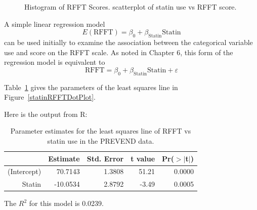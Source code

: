 \begin{figure}[ht]
	\centering
	\caption{ Histogram of RFFT Scores.  scatterplot of statin use vs RFFT score.}
	\label{statinRFFTPlots}
\end{figure}


A simple linear regression model
\[
   E(\text{RFFT}) = \beta_0 + \beta_{\text{Statin}}\text{Statin}
   \label{RFFTStatinModel}
\]
can be used initially to examine the association between the categorical variable  use and score on the RFFT scale.  As noted in Chapter 6, this form of the regression model is equivalent to 
\[
   \text{RFFT} = \beta_0 + \beta_{\text{Statin}}\text{Statin} + \varepsilon
\]

Table~\ref{RFFTStatinRegression} gives the parameters of the least squares line in Figure~\ref{statinRFFTDotPlot}.

Here is the output from \textsf{R}:

\begin{table}[ht]
\centering
\begin{tabular}{rrrrr}
  \hline
 & Estimate & Std. Error & t value & Pr($>$$|$t$|$) \\ 
  \hline
(Intercept) & 70.7143 & 1.3808 & 51.21 & 0.0000 \\ 
  Statin & -10.0534 & 2.8792 & -3.49 & 0.0005 \\ 
   \hline
\end{tabular}
\caption{Parameter estimates for the least squares line of RFFT vs statin use in the PREVEND data.}
\label{RFFTStatinRegression}
\end{table} 
The $R^2$ for this model is 0.0239.
 
